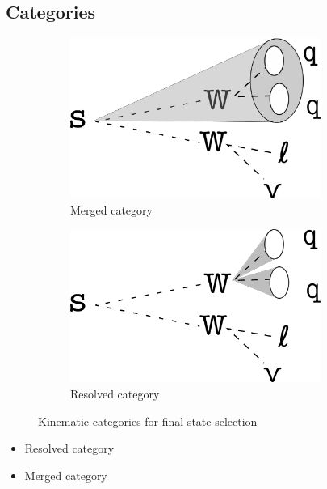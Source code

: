 \documentclass[12pt]{article}
\begin{document}
\subsection{Categories}
\begin{figure}[H]
     \centering
     \begin{subfigure}[b]{0.4\textwidth}
         \centering
         \includegraphics[width=0.9\textwidth]{figures/merged.png}
         \caption[]{Merged category}
         \label{fig:merged}
     \end{subfigure}
     \hfill
     \begin{subfigure}[b]{0.4\textwidth}
         \centering
         \includegraphics[width=0.9\textwidth]{figures/resolved.png}
         \caption[]{Resolved category}
         \label{fig:resolved}
     \end{subfigure}
\caption[]{Kinematic categories for final state selection}
\label{fig:categories}
\end{figure}
\begin{itemize}
\item Resolved category
\item Merged category
\end{itemize}
\end{document}
